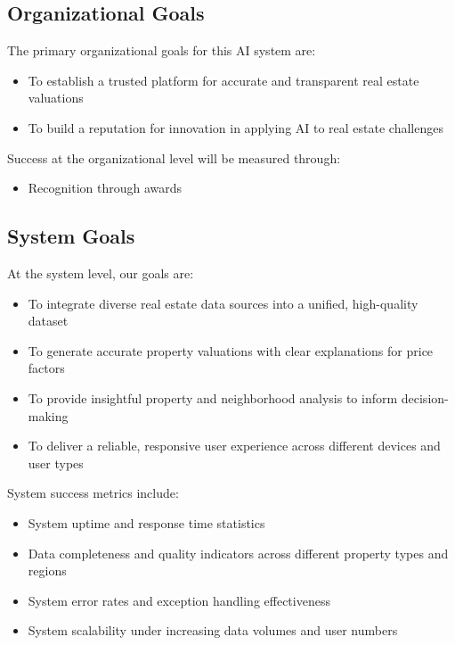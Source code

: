 \subsection{Organizational Goals}

The primary organizational goals for this AI system are:

\begin{itemize}
	\item To establish a trusted platform for accurate and transparent real estate valuations
	\item To build a reputation for innovation in applying AI to real estate challenges
\end{itemize}

Success at the organizational level will be measured through:

\begin{itemize}
	\item Recognition through awards
\end{itemize}

\subsection{System Goals}

At the system level, our goals are:

\begin{itemize}
	\item To integrate diverse real estate data sources into a unified, high-quality dataset
	\item To generate accurate property valuations with clear explanations for price factors
	\item To provide insightful property and neighborhood analysis to inform decision-making
	\item To deliver a reliable, responsive user experience across different devices and user types
\end{itemize}

System success metrics include:

\begin{itemize}
	\item System uptime and response time statistics
	\item Data completeness and quality indicators across different property types and regions
	\item System error rates and exception handling effectiveness
	\item System scalability under increasing data volumes and user numbers
\end{itemize}

